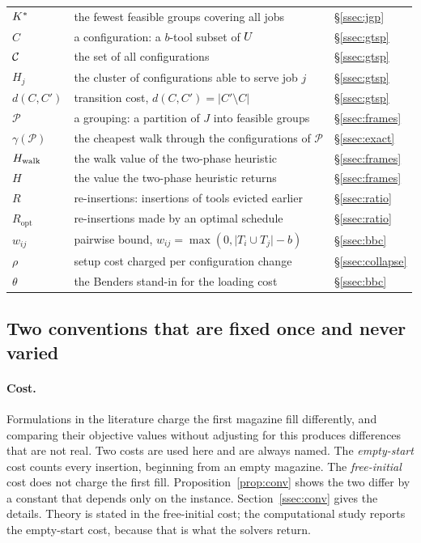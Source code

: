 \begin{tabular}{@{}l>{\raggedright\arraybackslash}p{8.9cm}l@{}}
$K^{\ast}$           & the fewest feasible groups covering all jobs                 & \S\ref{ssec:jgp} \\
  $C$              & a configuration: a $b$-tool subset of $U$                  & \S\ref{ssec:gtsp} \\
$\mathcal{C}$         & the set of all configurations                                & \S\ref{ssec:gtsp} \\
$H_j$            & the cluster of configurations able to serve job $j$          & \S\ref{ssec:gtsp} \\
$d(C,C')$        & transition cost, $d(C,C')=\lvert C'\setminus C\rvert$        & \S\ref{ssec:gtsp} \\
$\mathcal{P}$    & a grouping: a partition of $J$ into feasible groups          & \S\ref{ssec:frames} \\
$\gamma(\mathcal{P})$ & the cheapest walk through the configurations of $\mathcal{P}$ & \S\ref{ssec:exact} \\
$H_{\mathrm{walk}}$         & the walk value of the two-phase heuristic                    & \S\ref{ssec:frames} \\
$H$              & the value the two-phase heuristic returns                    & \S\ref{ssec:frames} \\
$R$              & re-insertions: insertions of tools evicted earlier           & \S\ref{ssec:ratio} \\
$R_{\mathrm{opt}}$ & re-insertions made by an optimal schedule                  & \S\ref{ssec:ratio} \\
$w_{ij}$         & pairwise bound, $w_{ij}=\max(0,\lvert T_i\cup T_j\rvert-b)$  & \S\ref{ssec:bbc} \\
$\rho$           & setup cost charged per configuration change                  & \S\ref{ssec:collapse} \\
$\theta$         & the Benders stand-in for the loading cost                    & \S\ref{ssec:bbc} \\
\bottomrule
\end{tabular}

\subsection*{Two conventions that are fixed once and never varied}

\paragraph{Cost.}
Formulations in the literature charge the first magazine fill differently, and
comparing their objective values without adjusting for this produces differences
that are not real. Two costs are used here and are always named.
The \emph{empty-start} cost counts every insertion, beginning from an empty
magazine. The \emph{free-initial} cost does not charge the first fill.
Proposition~\ref{prop:conv} shows the two differ by a constant that depends only on
the instance. Section~\ref{ssec:conv} gives the details. Theory is stated in the
free-initial cost; the computational study reports the empty-start cost, because
that is what the solvers return.


